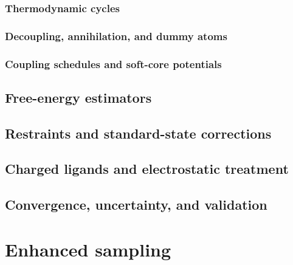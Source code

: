 \lipsum[1][1-3]

\subsubsection{Thermodynamic cycles}
\lipsum[1][1-3]

\subsubsection{Decoupling, annihilation, and dummy atoms}
\lipsum[1][1-3]

\subsubsection{Coupling schedules and soft-core potentials}
\lipsum[1][1-3]

\subsection{Free-energy estimators}
\lipsum[1][1-3]

\subsection{Restraints and standard-state corrections}
\lipsum[1][1-3]

\subsection{Charged ligands and electrostatic treatment}
\lipsum[1][1-3]

\subsection{Convergence, uncertainty, and validation}
\lipsum[1][1-3]

\section{Enhanced sampling}

